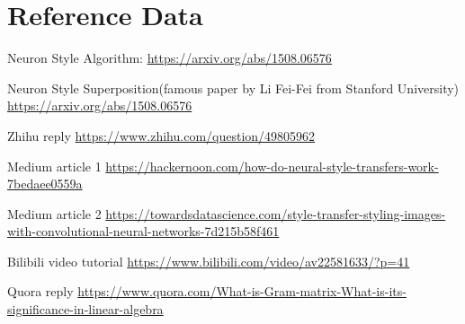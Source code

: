\documentclass[11pt, a4paper]{article} %
\begin{document}
\section{Reference Data}
\item Neuron Style Algorithm: \url{https://arxiv.org/abs/1508.06576}
\item Neuron Style Superposition(famous paper by Li Fei-Fei from Stanford University) \url{https://arxiv.org/abs/1508.06576}
\item Zhihu reply \url{https://www.zhihu.com/question/49805962}
\item Medium article 1 \url{https://hackernoon.com/how-do-neural-style-transfers-work-7bedaee0559a}
\item Medium article 2 \url{https://towardsdatascience.com/style-transfer-styling-images-with-convolutional-neural-networks-7d215b58f461}
\item Bilibili video tutorial \url{https://www.bilibili.com/video/av22581633/?p=41}
\item Quora reply \url{https://www.quora.com/What-is-Gram-matrix-What-is-its-significance-in-linear-algebra}
\end{document}
